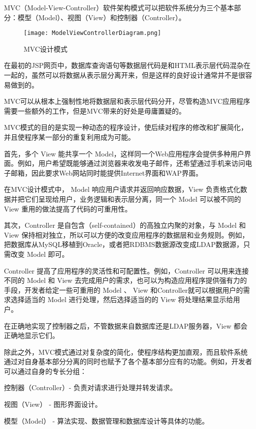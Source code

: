 MVC（Model-View-Controller）软件架构模式可以把软件系统分为三个基本部分：模型（Model）、视图（View）和控制器（Controller）。

\begin{figure}[htbp]
\centering
\texttt{[image: ModelViewControllerDiagram.png]}
\caption{MVC设计模式}
\end{figure}

在最初的JSP网页中，数据库查询语句等数据层代码是和HTML表示层代码混杂在一起的，虽然可以将数据从表示层分离开来，但是这样的良好设计通常并不是很容易做到的。

MVC可以从根本上强制性地将数据层和表示层代码分开，尽管构造MVC应用程序需要一些额外的工作，但是MVC带来的好处是毋庸置疑的。

MVC模式的目的是实现一种动态的程序设计，使后续对程序的修改和扩展简化，并且使程序某一部分的重复利用成为可能。

首先，多个 View 能共享一个 Model，这样同一个Web应用程序会提供多种用户界面。例如，用户希望既能够通过浏览器来收发电子邮件，还希望通过手机来访问电子邮箱，因此要求Web网站同时能提供Internet界面和WAP界面。

在MVC设计模式中， Model 响应用户请求并返回响应数据，View 负责格式化数据并把它们呈现给用户，业务逻辑和表示层分离，同一个 Model 可以被不同的 View 重用的做法提高了代码的可重用性。

其次，Controller 是自包含（self-contained）的高独立内聚的对象，与 Model 和 View 保持相对独立，所以可以方便的改变应用程序的数据层和业务规则。例如，把数据库从MySQL移植到Oracle，或者把RDBMS数据源改变成LDAP数据源，只需改变 Model 即可。

Controller 提高了应用程序的灵活性和可配置性。例如，Controller 可以用来连接不同的 Model 和 View 去完成用户的需求，也可以为构造应用程序提供强有力的手段，开发者给定一些可重用的 Model 、 View 和Controller就可以根据用户的需求选择适当的 Model 进行处理，然后选择适当的的 View 将处理结果显示给用户。

在正确地实现了控制器之后，不管数据来自数据库还是LDAP服务器，View 都会正确地显示它们。

除此之外，MVC模式通过对复杂度的简化，使程序结构更加直观，而且软件系统通过对自身基本部分分离的同时也赋予了各个基本部分应有的功能。例如，开发者可以通过自身的专长分组：

\begin{compactitem}
\item 控制器（Controller）- 负责对请求进行处理并转发请求。
\item 视图（View） - 图形界面设计。
\item 模型（Model） - 算法实现、数据管理和数据库设计等具体的功能。
\end{compactitem}

